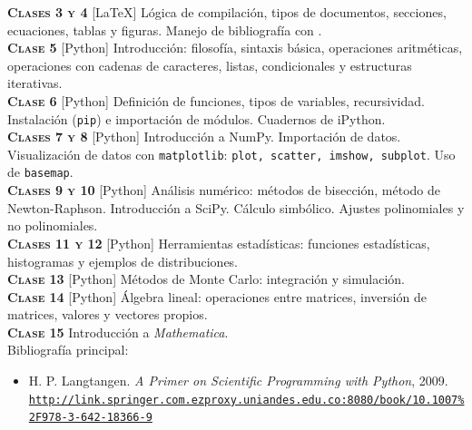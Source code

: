 \documentclass[letterpaper,10pt,onecolumn]{article}
\begin{document}
\noindent\textbf{\textsc{Clases 3 y 4}} [\LaTeX] Lógica de compilación, tipos de documentos, secciones, ecuaciones, tablas y figuras. Manejo de bibliografía con \BibTeX.\\[-0.3cm]

\noindent\textbf{\textsc{Clase 5}} [Python] Introducción: filosofía, sintaxis básica, operaciones aritméticas, operaciones con cadenas de caracteres, listas, condicionales y estructuras iterativas.\\[-0.3cm]

\noindent\textbf{\textsc{Clase 6}} [Python] Definición de funciones, tipos de variables, recursividad. Instalación (\verb+pip+) e importación de módulos. Cuadernos de iPython.\\[-0.3cm]

\noindent\textbf{\textsc{Clases 7 y 8}} [Python] Introducción a NumPy.  Importación de datos. Visualización de datos con \verb+matplotlib+: \verb+plot, scatter, imshow, subplot+. Uso de \verb+basemap+.\\[-0.3cm]

\noindent\textbf{\textsc{Clases 9 y 10}} [Python] Análisis numérico: métodos de bisección, método de Newton-Raphson. Introducción a SciPy. Cálculo simbólico. Ajustes polinomiales y no polinomiales.\\[-0.3cm]

\noindent\textbf{\textsc{Clases 11 y 12}} [Python] Herramientas estadísticas: funciones estadísticas, histogramas y ejemplos de distribuciones.\\[-0.3cm]

\noindent\textbf{\textsc{Clase 13}} [Python] Métodos de Monte Carlo: integración y simulación.\\[-0.3cm]

\noindent\textbf{\textsc{Clase 14}} [Python] Álgebra lineal: operaciones entre matrices, inversión de matrices, valores y vectores propios.\\[-0.3cm]

\noindent\textbf{\textsc{Clase 15}} Introducción a {\it Mathematica}.\\[+0.1cm]

\noindent\normalsize Bibliografía principal:


\begin{itemize}
	\item H. P. Langtangen. \textit{A Primer on Scientific Programming with Python}, 2009.\\
	\href{http://link.springer.com.ezproxy.uniandes.edu.co:8080/book/10.1007\%2F978-3-642-18366-9}{\nolinkurl{http://link.springer.com.ezproxy.uniandes.edu.co:8080/book/10.1007\%2F978-3-642-18366-9}}\\[-0.6cm]
\end{itemize}
\end{document}
